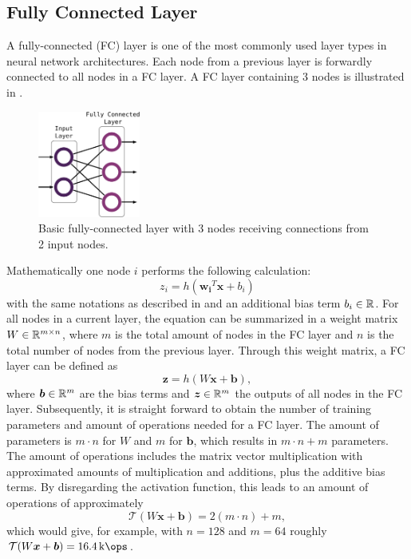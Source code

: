 
\subsection{Fully Connected Layer}
A fully-connected (FC) layer is one of the most commonly used layer types in neural network architectures.
Each node from a previous layer is forwardly connected to all nodes in a FC layer.
A FC layer containing 3 nodes is illustrated in .
\begin{figure}[!ht]
  \centering
    \includegraphics[width=0.30\textwidth]{./4_nn/figs/nn_theory_fc.pdf}
  \caption{Basic fully-connected layer with 3 nodes receiving connections from 2 input nodes.}
  \label{fig:nn_theory_fc}
\end{figure}
\FloatBarrier
\noindent
Mathematically one node $i$ performs the following calculation:
\begin{equation}\label{eq:nn_theory_fc_single}
  z_i = h(\bm{w_i}^T \bm{x} + b_i)
\end{equation}
with the same notations as described in  and an additional bias term $b_i \in \mathbb{R}$.
For all nodes in a current layer, the equation  can be summarized in a weight matrix $W \in \mathbb{R}^{m \times n}$, where $m$ is the total amount of nodes in the FC layer and $n$ is the total number of nodes from the previous layer.
Through this weight matrix, a FC layer can be defined as
\begin{equation}
  \bm{z} = h(W \bm{x} + \bm{b}),
\end{equation}
where $\bm{b} \in \mathbb{R}^m$ are the bias terms and $\bm{z} \in \mathbb{R}^m$ the outputs of all nodes in the FC layer.
Subsequently, it is straight forward to obtain the number of training parameters and amount of operations needed for a FC layer.
The amount of parameters is $m \cdot n$ for $W$ and $m$ for $\bm{b}$, which results in $m \cdot n + m$ parameters.
The amount of operations includes the matrix vector multiplication with approximated amounts of multiplication and additions, plus the additive bias terms.
By disregarding the activation function, this leads to an amount of operations of approximately
\begin{equation} 
  \mathcal{T}(W \bm{x} + \bm{b}) = 2 (m \cdot n) + m,
\end{equation}
which would give, for example, with $n = 128$ and $m = 64$ roughly $\mathcal{T}(W \bm{x} + \bm{b}) = \SI{16.4}{\kilo\ops}$.


